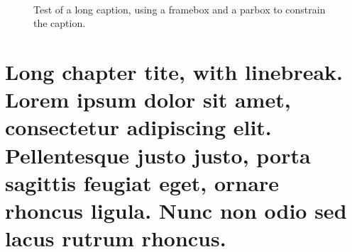 \documentclass[letterpaper%
, twoside%
, 12pt%
,these%
, english%
,creativecommons,hyperref%
]{thETS}
\begin{document}
\cleardoublepage


\reversemarginpar


\begin{introduction}

\lipsum[1] %

\begin{figure}
	\centering %
	 \\ \parbox{0.75\textwidth}{\caption{Test of a long caption, using a framebox and a parbox to constrain the caption.}\label{fig:vueEts}} %
\end{figure}

\lipsum[1] %


\end{introduction}



\chapter{Long chapter tite, with linebreak. Lorem ipsum dolor sit amet, consectetur adipiscing elit. Pellentesque justo justo, porta sagittis feugiat eget, ornare rhoncus ligula. Nunc non odio sed lacus rutrum rhoncus.}
\end{document}
